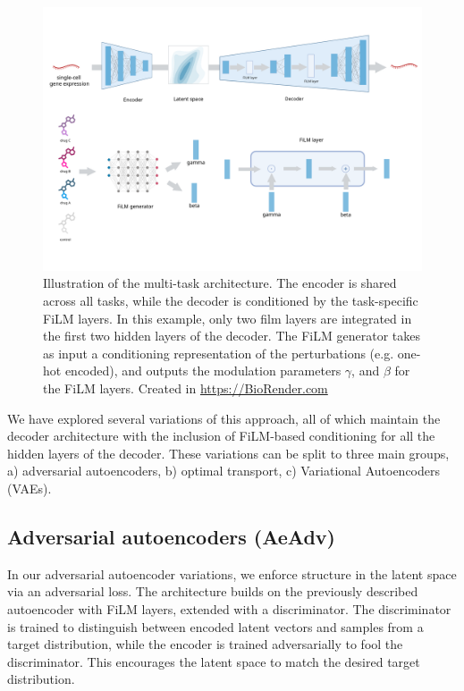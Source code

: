 \documentclass[12pt, a4paper]{article}
\begin{document}

\begin{figure}[h!]
    \centering
    \includegraphics[width=\textwidth]{biorender_film_architecture.png}
    \caption{Illustration of the multi-task architecture. The encoder is shared across all tasks, while the decoder is conditioned by the task-specific FiLM layers. In this example, only two film layers are integrated in the first two hidden layers of the decoder. The FiLM generator takes as input a conditioning representation of the perturbations (e.g. one-hot encoded), and outputs the modulation parameters $\gamma$, and $\beta$ for the FiLM layers. Created in  \url{https://BioRender.com}}
\end{figure}


We have explored several variations of this approach, all of which maintain the decoder architecture with the inclusion of FiLM-based conditioning for all the hidden layers of the decoder. These variations can be split to three main groups, a) adversarial autoencoders, b) optimal transport, c) Variational Autoencoders (VAEs).

\subsection{Adversarial autoencoders (AeAdv)}

In our adversarial autoencoder variations, we enforce structure in the latent space via an adversarial loss. The architecture builds on the previously described autoencoder with FiLM layers, extended with a discriminator. The discriminator is trained to distinguish between encoded latent vectors and samples from a target distribution, while the encoder is trained adversarially to fool the discriminator. This encourages the latent space to match the desired target distribution.
\end{document}

